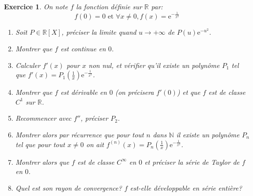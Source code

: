 \documentclass[12pt,a4paper]{article}
\newcommand{\R}{\mathbb{R}}
\newcommand{\N}{\mathbb{N}}
\newcommand{\E}{\mathrm{e}}
\theoremstyle{break}
\theoremstyle{break}
\newtheorem{Exo}{Exercice}
\begin{document}
\begin{Exo}
	
	
	On note $f$ la fonction définie sur $\R$ par:
	$$f(0)=0\text{ et }\forall x\neq 0,f(x)=\E^{-\frac{1}{x^2}}$$
	\begin{enumerate}
		\item Soit $P\in \R[X]$, préciser la limite quand $u\to +\infty$ de $P(u)\E^{-u^2}$.
		\item
		Montrer que $f$ est continue en $0$.
		\item
		Calculer $f'(x)$ pour  $x$ non nul, et vérifier qu'il existe un polynôme $P_1$ tel que $f'(x)=P_1\left(\frac{1}{x}\right)\E^{-\frac{1}{x^2}}$.
		\item
		Montrer que $f$ est dérivable en $0$ (on précisera $f'(0)$) et que $f$ est de classe $C^1$ sur $\R$.
		\item
		Recommencer avec $f''$, préciser $P_2$.
		\item
		Montrer alors par récurrence que pour tout $n$ dans $\N$ il existe un polynôme $P_n$ tel que pour tout $x\neq 0$ on ait $f^{(n)}(x)=P_n\left(\frac{1}{x}\right)\E^{-\frac{1}{x^2}}$.
		\item
		Montrer alors que $f$ est de classe $C^{\infty}$ en $0$ et préciser la série de Taylor de $f$ en $0$.
		\item
		Quel est son rayon de convergence? $f$ est-elle développable en série entière?
	\end{enumerate}
\end{Exo}
	
	
	
	
%		
	
\end{document}
